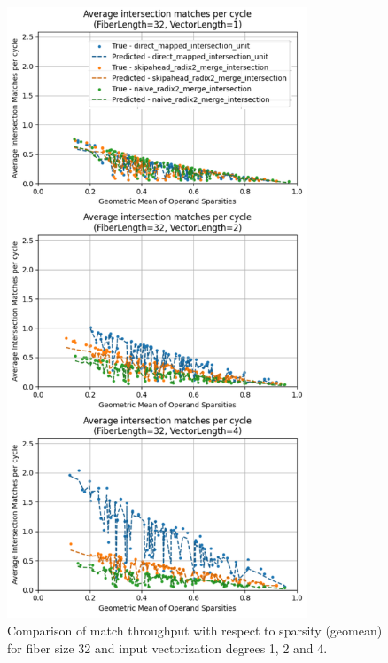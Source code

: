 \begin{figure}[H]
    \centering
    \includegraphics[width=0.8\textwidth]{figures/isect_model_fl32_vl1.pdf}
    \caption{Comparison of match throughput with respect to sparsity (geomean) for fiber size 32 and input vectorization degrees 1, 2 and 4.}
    \label{fig:isect_model_fl32_vl1}
\end{figure}

\clearpage